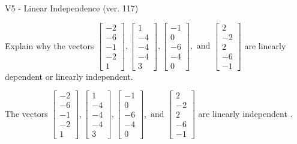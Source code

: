 \begin{exercise}
  \begin{exerciseTitle}V5 - Linear Independence (ver. 117)\end{exerciseTitle}
  \begin{exerciseStatement}
    Explain why the vectors \(\left[\begin{array}{r}
-2 \\
-6 \\
-1 \\
-2 \\
1
\end{array}\right] , \left[\begin{array}{r}
1 \\
-4 \\
-4 \\
-4 \\
3
\end{array}\right] , \left[\begin{array}{r}
-1 \\
0 \\
-6 \\
-4 \\
0
\end{array}\right] , \text{ and } \left[\begin{array}{r}
2 \\
-2 \\
2 \\
-6 \\
-1
\end{array}\right]\) are linearly dependent or linearly independent.	


  \end{exerciseStatement}
  \begin{exerciseAnswer}
   The vectors \(\left[\begin{array}{r}
-2 \\
-6 \\
-1 \\
-2 \\
1
\end{array}\right] , \left[\begin{array}{r}
1 \\
-4 \\
-4 \\
-4 \\
3
\end{array}\right] , \left[\begin{array}{r}
-1 \\
0 \\
-6 \\
-4 \\
0
\end{array}\right] , \text{ and } \left[\begin{array}{r}
2 \\
-2 \\
2 \\
-6 \\
-1
\end{array}\right]\) are 
  	 linearly independent  .
  


  \end{exerciseAnswer}
\end{exercise}